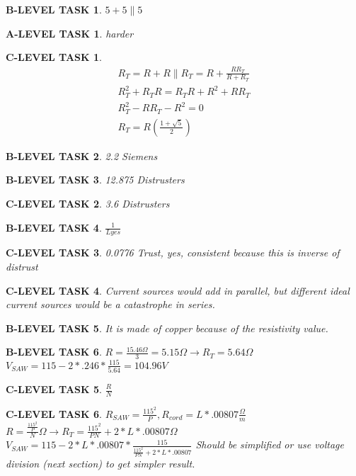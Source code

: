 \documentclass{book}
\numberwithin{equation}{section}
\newtheorem{alevel}{A-LEVEL TASK}
\newtheorem{blevel}{B-LEVEL TASK}
\newtheorem{clevel}{C-LEVEL TASK}
\theoremstyle{definition}
\begin{document}
\begin{blevel}$5+5\parallel 5$\end{blevel}
\begin{alevel}harder\end{alevel}
\begin{clevel} 
\begin{align*}
R_T=R+R\parallel R_T=R+\frac{RR_T}{R+R_T}\\
R_T^2+R_TR=R_TR+R^2+RR_T\\
R_T^2-RR_T-R^2=0\\
R_T=R(\frac{1+\sqrt{5}}{2})
\end{align*}
\end{clevel}
\begin{blevel}2.2 Siemens\end{blevel}
\begin{blevel}12.875 Distrusters\end{blevel}
\begin{clevel}3.6 Distrusters\end{clevel}
\begin{blevel}$\frac{1}{Lyes}$\end{blevel}

\begin{clevel}0.0776 Trust, yes, consistent because this is inverse of distrust\end{clevel}

\begin{clevel}Current sources would add in parallel, but different ideal current sources would be a catastrophe in series.\end{clevel}
\begin{blevel}It is made of copper because of the resistivity value.\end{blevel}
\begin{blevel}$R=\frac{15.46\Omega}{3}=5.15 \Omega \rightarrow R_T=5.64\Omega$\\
$V_{SAW}=115-2*.246*\frac{115}{5.64}=104.96V$\end{blevel}
\begin{clevel}$\frac{R}{N}$\end{clevel}
\begin{clevel}$R_{SAW}=\frac{115^2}{P}, R_{cord}=L*.00807 \frac{\Omega}{m}$\\
$R=\frac{\frac{115^2}{P}}{N}\Omega \rightarrow R_T=\frac{115^2}{PN}+2*L*.00807 \Omega $\\
$V_{SAW}=115-2*L*.00807*\frac{115}{\frac{115^2}{PN}+2*L*.00807}$
Should be simplified or use voltage division (next section) to get simpler result.
\end{clevel}
\end{document}

